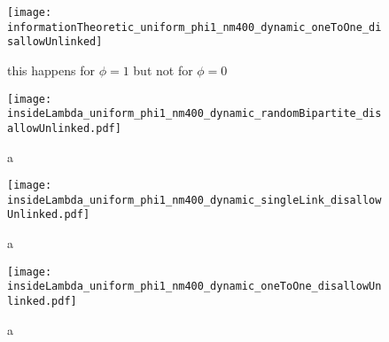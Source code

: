 \begin{figure}
  \centering
  \texttt{[image: informationTheoretic\_uniform\_phi1\_nm400\_dynamic\_oneToOne\_disallowUnlinked]}
  \caption{this happens for $\phi=1$ but not for $\phi=0$}
  \label{fig:informationTheoretic_uniform_phi1_nm400_dynamic_oneToOne_disallowUnlinked}
\end{figure}

\begin{figure}
  \centering
  \texttt{[image: insideLambda\_uniform\_phi1\_nm400\_dynamic\_randomBipartite\_disallowUnlinked.pdf]}
  \caption{a}
  \label{fig:insideLambda_uniform_phi1_nm400_dynamic_randomBipartite_disallowUnlinked}
\end{figure}

\begin{figure}
  \centering
  \texttt{[image: insideLambda\_uniform\_phi1\_nm400\_dynamic\_singleLink\_disallowUnlinked.pdf]}
  \caption{a}
  \label{fig:insideLambda_uniform_phi1_nm400_dynamic_singleLink_disallowUnlinked}
\end{figure}

\begin{figure}
  \centering
  \texttt{[image: insideLambda\_uniform\_phi1\_nm400\_dynamic\_oneToOne\_disallowUnlinked.pdf]}
  \caption{a}
  \label{fig:insideLambda_uniform_phi1_nm400_dynamic_oneToOne_disallowUnlinked}
\end{figure}

